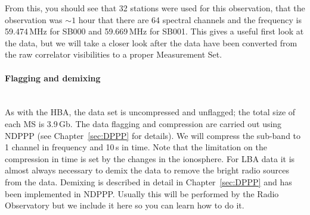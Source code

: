 % 
% 
% 
% 
% 
% 
From this, you should see that 32 stations were used for this observation, that the observation was $\sim1$ hour that there are 64 spectral channels and the frequency is 59.474\,MHz for SB000 and  59.669\,MHz for SB001. This gives a useful first look at the data, but we will take a closer look after the data have been converted from the raw correlator visibilities to a proper Measurement Set.



\paragraph{Flagging and demixing}\mbox{}\\

As with the HBA, the data set is uncompressed and unflagged; the total size of each MS is 3.9\,Gb. The data flagging and compression are carried out using NDPPP (see Chapter~\ref{sec:DPPP} for details). We will compress the sub-band to 1 channel in frequency and 10\,s in time. Note that the limitation on the compression in time is set by the changes in the ionosphere. For LBA data it is almost always necessary to demix the data to remove the bright radio sources from the data. Demixing is described in detail in Chapter~\ref{sec:DPPP} and has been implemented in NDPPP. Usually this will be performed by the Radio Observatory but we include it here so you can learn how to do it.

